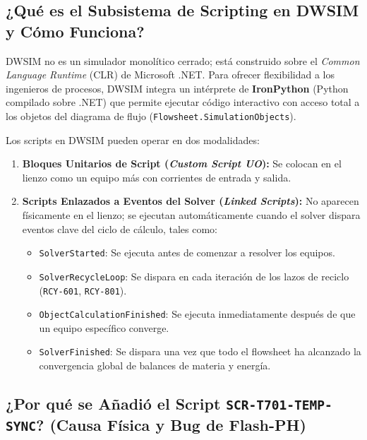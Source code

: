 \documentclass[11pt,a4paper]{article}
\begin{document}
\subsection{¿Qué es el Subsistema de Scripting en DWSIM y Cómo Funciona?}
DWSIM no es un simulador monolítico cerrado; está construido sobre el \textit{Common Language Runtime} (CLR) de Microsoft .NET. Para ofrecer flexibilidad a los ingenieros de procesos, DWSIM integra un intérprete de \textbf{IronPython} (Python compilado sobre .NET) que permite ejecutar código interactivo con acceso total a los objetos del diagrama de flujo (\texttt{Flowsheet.SimulationObjects}).

Los scripts en DWSIM pueden operar en dos modalidades:
\begin{enumerate}
    \item \textbf{Bloques Unitarios de Script (\textit{Custom Script UO}):} Se colocan en el lienzo como un equipo más con corrientes de entrada y salida.
    \item \textbf{Scripts Enlazados a Eventos del Solver (\textit{Linked Scripts}):} No aparecen físicamente en el lienzo; se ejecutan automáticamente cuando el solver dispara eventos clave del ciclo de cálculo, tales como:
    \begin{itemize}
        \item \texttt{SolverStarted}: Se ejecuta antes de comenzar a resolver los equipos.
        \item \texttt{SolverRecycleLoop}: Se dispara en cada iteración de los lazos de reciclo (\texttt{RCY-601}, \texttt{RCY-801}).
        \item \texttt{ObjectCalculationFinished}: Se ejecuta inmediatamente después de que un equipo específico converge.
        \item \texttt{SolverFinished}: Se dispara una vez que todo el flowsheet ha alcanzado la convergencia global de balances de materia y energía.
    \end{itemize}
\end{enumerate}

\subsection{¿Por qué se Añadió el Script \texttt{SCR-T701-TEMP-SYNC}? (Causa Física y Bug de Flash-PH)}
\end{document}
